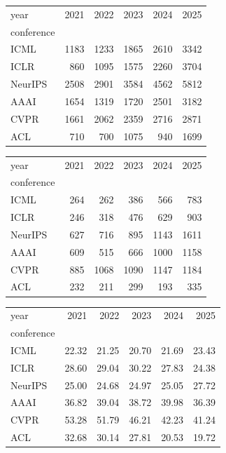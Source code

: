 
\begin{tabular}{lrrrrr}
\toprule
year & 2021 & 2022 & 2023 & 2024 & 2025 \\
conference &  &  &  &  &  \\
\midrule
ICML & 1183 & 1233 & 1865 & 2610 & 3342 \\
ICLR & 860 & 1095 & 1575 & 2260 & 3704 \\
NeurIPS & 2508 & 2901 & 3584 & 4562 & 5812 \\
AAAI & 1654 & 1319 & 1720 & 2501 & 3182 \\
CVPR & 1661 & 2062 & 2359 & 2716 & 2871 \\
ACL & 710 & 700 & 1075 & 940 & 1699 \\
\bottomrule
\end{tabular}

\begin{tabular}{lrrrrr}
\toprule
year & 2021 & 2022 & 2023 & 2024 & 2025 \\
conference &  &  &  &  &  \\
\midrule
ICML & 264 & 262 & 386 & 566 & 783 \\
ICLR & 246 & 318 & 476 & 629 & 903 \\
NeurIPS & 627 & 716 & 895 & 1143 & 1611 \\
AAAI & 609 & 515 & 666 & 1000 & 1158 \\
CVPR & 885 & 1068 & 1090 & 1147 & 1184 \\
ACL & 232 & 211 & 299 & 193 & 335 \\
\bottomrule
\end{tabular}

\begin{tabular}{lrrrrr}
\toprule
year & 2021 & 2022 & 2023 & 2024 & 2025 \\
conference &  &  &  &  &  \\
\midrule
ICML & 22.32 & 21.25 & 20.70 & 21.69 & 23.43 \\
ICLR & 28.60 & 29.04 & 30.22 & 27.83 & 24.38 \\
NeurIPS & 25.00 & 24.68 & 24.97 & 25.05 & 27.72 \\
AAAI & 36.82 & 39.04 & 38.72 & 39.98 & 36.39 \\
CVPR & 53.28 & 51.79 & 46.21 & 42.23 & 41.24 \\
ACL & 32.68 & 30.14 & 27.81 & 20.53 & 19.72 \\
\bottomrule
\end{tabular}
